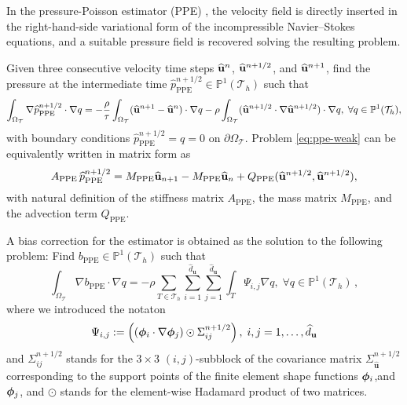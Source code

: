   
In the pressure-Poisson estimator (PPE) \cite{ebbers2001}, the velocity field is directly inserted in the right-hand-side variational form of the incompressible Navier--Stokes equations, and a suitable pressure field is recovered solving the resulting problem.
\begin{problem}[PPE]
  \label{def:ppe}
  Given three consecutive velocity time steps $\widehat{\mathbf{u}}^{n}$, $\widehat{\mathbf{u}}^{n+1/2}$, and $\widehat{\mathbf{u}}^{n+1}$, find the
pressure at the intermediate time $\widehat{p}^{n+1/2}_{\text{PPE}}\in\mathbb{P}^1(\mathcal{T}_h)$ such that
  \begin{align}
    \int_{\Omega_{\mathcal T}} \nabla \widehat{p}^{n+1/2}_{\text{PPE}}\cdot\nabla q  =
     -\frac{\rho}{\tau}\int_{\Omega_{\mathcal T}} (\widehat{\ub}^{n+1}-\widehat{\ub}^{n})\cdot\nabla q - \rho\int_{\Omega_{\mathcal T}} (\widehat{\ub}^{n+1/2}\cdot\nabla\widehat{\ub}^{n+1/2})\cdot\nabla q,\;
     \forall q\in\mathbb{P}^1(\mathcal{T}_h),%
     \label{eq:ppe-weak}
  \end{align}
  with boundary conditions $\widehat{p}^{n+1/2}_{\text{PPE}}=q=0$ on $\partial \Omega_{\mathcal T}$. %
  Problem \eqref{eq:ppe-weak} can be equivalently written in matrix form as
  \begin{equation} \label{eq:ppe}
  A_{\text{PPE}}\,\widehat{p}^{n+1/2}_{\text{PPE}} = M_{\text{PPE}}\widehat{\mathbf{u}}_{n+1} - M_{\text{PPE}}\widehat{\mathbf{u}}_{n} + Q_{\text{PPE}}(\widehat{\mathbf{u}}^{n+1/2}, \widehat{\mathbf{u}}^{n+1/2}),
  \end{equation}
with natural definition of the stiffness matrix $A_{\text{PPE}}$, the mass matrix $M_{\text{PPE}}$,  and the advection term $Q_{\text{PPE}}$. 
 \end{problem} 

A bias correction for the estimator is obtained as the solution to the following problem:
Find $b_{\text{PPE}}\in\mathbb{P}^1(\mathcal{T}_h)$ such that %
  \begin{equation}\label{eq:ppe-bias}
    \int_{\Omega_{\mathcal T}} \nabla b_{\text{PPE}}\cdot\nabla q =-\rho\sum_{T\in\mathcal{T}_h}\sum_{i=1}^{\widehat{d}_{\mathbf u}}\sum_{j=1}^{\widehat{d}_{\mathbf u}}\int_T \Psi_{i,j}\nabla q,
    \; \forall q\in\mathbb{P}^1(\mathcal{T}_h)\,,
  \end{equation}
where we introduced the notaton
\begin{equation*}\label{eq:psi-bias-corr}
\Psi_{i,j} : = \left((\boldsymbol{\phi}_i\cdot\nabla\boldsymbol{\phi}_j)\odot\Sigma^{n+1/2}_{ij}\right), \; i,j=1,\hdots,\widehat{d}_{\mathbf u}
\end{equation*}
and $\Sigma^{n+1/2}_{ij}$ stands for the $3\times3$ $(i,j)$-subblock of the covariance matrix $\Sigma^{n+1/2}_{\widehat{\mathbf u}}$ corresponding to the support points 
of the finite element shape functions $\boldsymbol{\phi}_i$,and $\boldsymbol{\phi}_j$, and $\odot$ stands for the element-wise Hadamard product of two matrices.



